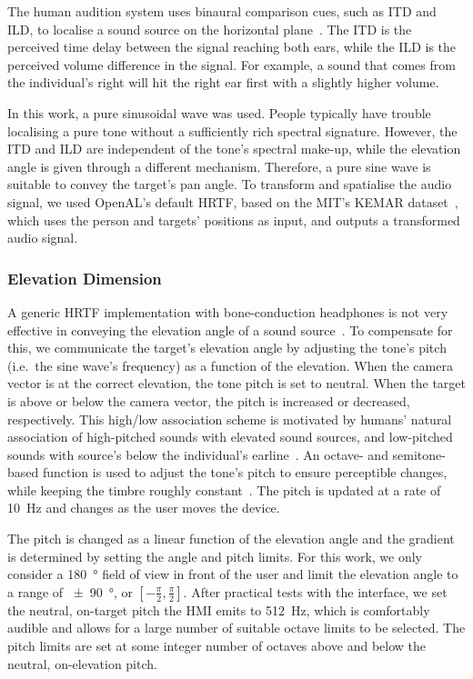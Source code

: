 \documentclass[]{interact}
\begin{document}
The human audition system uses binaural comparison cues, such as ITD and ILD, to localise a sound source on the horizontal plane~\citep{blauert1969sound}.
The ITD is the perceived time delay between the signal reaching both ears, while the ILD is the perceived volume difference in the signal.
For example, a sound that comes from the individual's right will hit the right ear first with a slightly higher volume.

In this work, a pure sinusoidal wave was used. 
People typically have trouble localising a pure tone without a sufficiently rich spectral signature.
However, the ITD and ILD are independent of the tone's spectral make-up, while the elevation angle is given through a different mechanism. Therefore, a pure sine wave is suitable to convey the target's pan angle.
To transform and spatialise the audio signal, we used OpenAL's default HRTF, based on the MIT's KEMAR dataset~\citep{hiebert2005openal}, which uses the person and targets' positions as input, and outputs a transformed audio signal.

\subsubsection{Elevation Dimension}

A generic HRTF implementation with bone-conduction headphones is not very effective in conveying the elevation angle of a sound source~\citep{macdonald2006spatial,schonstein2008comparison}.
To compensate for this, we communicate the target's elevation angle by adjusting the tone's pitch (i.e.\ the sine wave's frequency) as a function of the elevation. 
When the camera vector is at the correct elevation, the tone pitch is set to neutral.
When the target is above or below the camera vector, the pitch is increased or decreased, respectively.
This high/low association scheme is motivated by humans' natural association of high-pitched sounds with elevated sound sources, and low-pitched sounds with source's below the individual's earline~\citep{pratt1930spatial,blauert1997spatial}.
An octave- and semitone-based function is used to adjust the tone's pitch to ensure perceptible changes, while keeping the timbre roughly constant~\citep{shepard1964circularity}.
The pitch is updated at a rate of \SI{10}{\hertz} and changes as the user moves the device.

The pitch is changed as a linear function of the elevation angle and the gradient is determined by setting the angle and pitch limits.
For this work, we only consider a \SI{180}{\degree} field of view in front of the user and limit the elevation angle to a range of \SI{\pm90}{\degree}, or $[-\frac{\pi}{2}, \frac{\pi}{2}]$.
After practical tests with the interface, we set the neutral, on-target pitch the HMI emits to \SI{512}{\hertz}, which is comfortably audible and allows for a large number of suitable octave limits to be selected.
The pitch limits are set at some integer number of octaves above and below the neutral, on-elevation pitch.
\end{document}
